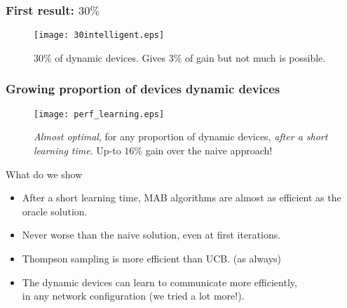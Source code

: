 \subsubsection{First result: $30\%$}

\begin{frameO}

    \begin{figure}[h!]
        \centering
        \texttt{[image: 30intelligent.eps]}

            $30\%$ of dynamic devices. Gives $3\%$ of gain but not much is possible.
    \end{figure}

\end{frameO}


\subsubsection{Growing proportion of devices dynamic devices}

\begin{frameO}[Dependency on \(D/(S+D)\)]

    \begin{figure}[h!]
        \centering
        \texttt{[image: perf\_learning.eps]}

            \emph{Almost optimal}, for any proportion of dynamic devices, \emph{after a short learning time}. Up-to $16\%$ gain over the naive approach!
    \end{figure}

\end{frameO}


\begin{frameO}

    \begin{colorblock}{What do we show}

        \begin{itemize}
            \setlength\itemsep{10pt}
            \item
                  After a short learning time, MAB algorithms are almost as efficient as
                  the oracle solution.
            \item
                  Never worse than the naive solution, even at first iterations.
            \item
                  Thompson sampling is more efficient than UCB.
                  (as always)
            \item
                  The dynamic devices can learn to communicate more efficiently,\\
                  in any network configuration (we tried a lot more!).
        \end{itemize}

    \end{colorblock}

\end{frameO}


